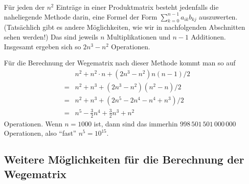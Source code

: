 Für jeden der $n^2$ Einträge in einer Produktmatrix besteht jedenfalls
die naheliegende Methode darin, eine Formel der Form $\sum_{k=0}^{n-1}
a_{ik}b_{kj}$ auszuwerten. (Tatsächlich gibt es andere Möglichkeiten,
wie wir in nachfolgenden Abschnitten sehen werden!) Das sind jeweils
$n$ Multiplikationen und $n-1$ Additionen. Insgesamt ergeben sich so
$2n^3-n^2$ Operationen.

Für die Berechnung der Wegematrix nach dieser Methode kommt man so auf
\begin{align*}
  & n^2 + n^2\cdot n + (2n^3-n^2)n(n-1)/2 \\
  = & n^2 + n^3 + (2n^3-n^2)(n^2-n)/2 \\
  = & n^2 + n^3 +(2n^5-2n^4-n^4+n^3)/2 \\
  = & n^5 -\frac{3}{2}n^4 + \frac{3}{2}n^3 + n^2
\end{align*}
Operationen. Wenn \zB $n=1000$ ist, dann sind das immerhin
$998\,501\,501\,000\,000$ Operationen, also "`fast"' $n^5=10^{15}$.

\Tut\subsection{Weitere M\"oglichkeiten f\"ur die Berechnung der Wegematrix}
\label{subsub:wegematrix-2}

